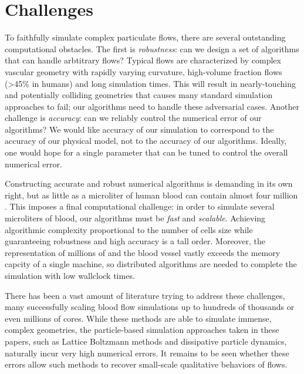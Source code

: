 \section{Challenges}
To faithfully simulate complex particulate flows, there are several outstanding computational obstacles.
The first is \textit{robustness}: can we design a set of algorithms that can handle arbtitrary flows?
Typical flows are characterized by complex vascular geometry with rapidly varying curvature, high-volume fraction flows (>45\% in humans) and long simulation times. 
This will result in nearly-touching and potentially colliding geometries that causes many standard simulation approaches to fail; our algorithms need to handle these adversarial cases.
Another challenge is \textit{accuracy}: can we reliably control the numerical error of our algorithms?
We would like accuracy of our simulation to correspond to the accuracy of our physical model, not to the accuracy of our algorithms.
Ideally, one would hope for a single parameter that can be tuned to control the overall numerical error.

Constructing accurate and robust numerical algorithms is demanding in its own right, but as little as a microliter of human blood can contain almost four million \rbcs.
This imposes a final computational challenge: in order to simulate several microliters of blood, our algorithms must be \textit{fast} and \textit{scalable}.
Achieving algorithmic complexity proportional to the number of cells size while guaranteeing robustness and high accuracy is a tall order.
Moreover, the representation of millions of \rbcs and the blood vessel vastly exceeds the memory capcity of a single machine, so distributed algorithms are needed to complete the simulation with low wallclock times.

There has been a vast amount of literature trying to address these challenges, many successfully scaling blood flow simulations up to hundreds of thousands \cite{grinberg2011new,rossinelli2015silico} or even millions \cite{gounley2017computational,randles2015massively} of cores.
While these methods are able to simulate immense, complex geometries, the particle-based simulation approaches taken in these papers, such as Lattice Boltzmann methods and dissipative particle dynamics, naturally incur very high numerical errors.
It remains to be seen whether these errors allow such methods to recover small-scale qualitative behaviors of \rbc flows.

